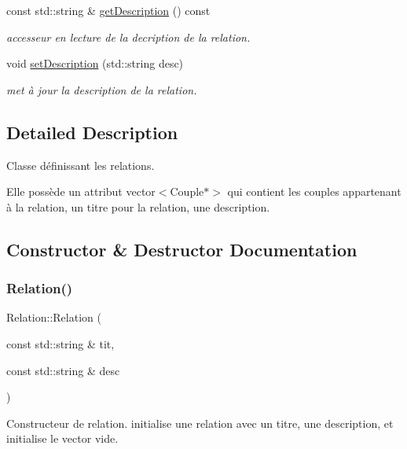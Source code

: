 \begin{DoxyCompactItemize}
\mbox{\label{class_relation_a3d43bd45798051dc3aa6015aa225a7c0}} 
const std\+::string \& \hyperlink{class_relation_a3d43bd45798051dc3aa6015aa225a7c0}{get\+Description} () const
\begin{DoxyCompactList}\small\item\em accesseur en lecture de la decription de la relation. \end{DoxyCompactList}\item 
void \hyperlink{class_relation_a481de051dc44065bb816b9b94b5d0c48}{set\+Description} (std\+::string desc)
\begin{DoxyCompactList}\small\item\em met à jour la description de la relation. \end{DoxyCompactList}\end{DoxyCompactItemize}


\subsection{Detailed Description}
Classe définissant les relations. 

Elle possède un attribut vector$<$\+Couple$\ast$$>$ qui contient les couples appartenant à la relation, un titre pour la relation, une description. 

\subsection{Constructor \& Destructor Documentation}
\mbox{\label{class_relation_ad80d3956dac01f647bdbb740fdd1cf73}} 
\subsubsection{\texorpdfstring{Relation()}{Relation()}}
{\footnotesize\ttfamily Relation\+::\+Relation (\begin{DoxyParamCaption}\item[{const std\+::string \&}]{tit,  }\item[{const std\+::string \&}]{desc }\end{DoxyParamCaption})\hspace{0.3cm}{\ttfamily [inline]}}



Constructeur de relation. initialise une relation avec un titre, une description, et initialise le vector vide. 


